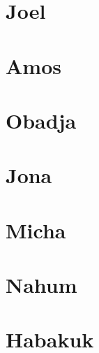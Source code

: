 \chapter{Joel}
\begin{multicols}{2}
  \raggedcolumns
  \parskip=0pt \relax
  
\end{multicols}

\chapter{Amos}
\begin{multicols}{2}
  \raggedcolumns
  \parskip=0pt \relax
  
\end{multicols}

\chapter{Obadja}
\begin{multicols}{2}
  \raggedcolumns
  \parskip=0pt \relax
  
\end{multicols}

\chapter{Jona}
\begin{multicols}{2}
  \raggedcolumns
  \parskip=0pt \relax
  
\end{multicols}

\chapter{Micha}
\begin{multicols}{2}
  \raggedcolumns
  \parskip=0pt \relax
  
\end{multicols}

\chapter{Nahum}
\begin{multicols}{2}
  \raggedcolumns
  \parskip=0pt \relax
  
\end{multicols}

\chapter{Habakuk}
\begin{multicols}{2}
  \raggedcolumns
  \parskip=0pt \relax
  
\end{multicols}

